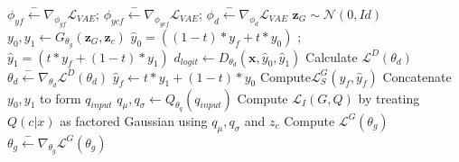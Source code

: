 \documentclass{amia}
\begin{document}
\begin{algorithm}
\begin{algorithmic}[1]
            $\phi_{yf} \xleftarrow{-} \nabla_{\phi_{yf}}\mathcal{L}_{VAE}$;
            \hspace*{\algorithmicindent} $\phi_{ycf} \xleftarrow{-} \nabla_{\phi_{ycf}}\mathcal{L}_{VAE}$;
            $\phi_d \xleftarrow{-} \nabla_{\phi_d}\mathcal{L}_{VAE}$
            \State  $\textbf{z}_G \sim \mathcal{N}(0,Id)$
            \State $y_0, y_1 \leftarrow G_{\theta_g}(\textbf{z}_G, \textbf{z}_c)$
            \State $\hat{y}_0 = ((1 - t) * y_f + t * y_0)$
            ; $\hat{y}_1 = (t * y_f + (1 - t) * y_1)$
            \State $d_{logit} \leftarrow D_{\theta_d}(\textbf{x}, \hat{y}_0, \hat{y}_1)$
            \State Calculate $\mathcal{L}^D(\theta_d)$
            \State $\theta_d \xleftarrow{-} \nabla_{\theta_d} \mathcal{L}^D(\theta_d)$
            \State $\hat{y}_f \leftarrow t * y_1 + (1 - t) * y_0$
            \State Compute$\mathcal{L}^G_S(y_f, \hat{y}_f)$
            \State Concatenate $y_0, y_1$ to form $q_{input}$
            \State $q_\mu, q_\sigma \leftarrow Q_{\theta_q}(q_{input})$
            \State Compute $\mathcal{L}_I(G, Q)$ by treating $Q(c|x)$ as factored Gaussian 
            using $q_\mu, q_\sigma$ and $z_c$
            \State Compute $\mathcal{L}^G(\theta_g)$
            \State $\theta_g \xleftarrow{-} \nabla_{\theta_g} \mathcal{L}^G(\theta_g)$
        \EndWhile
	\end{algorithmic} 
\end{algorithm}
\end{document}
